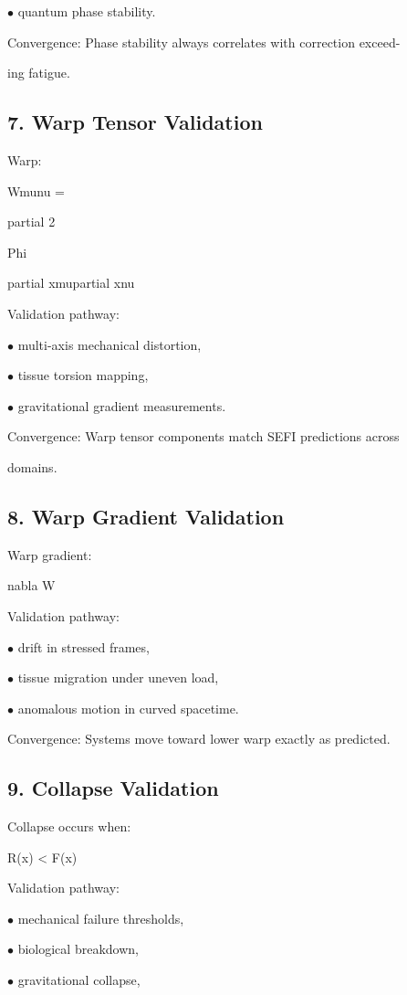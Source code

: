 \documentclass[10pt]{article}
\begin{document}
\noindent $\bullet$ quantum phase stability.

Convergence: Phase stability always correlates with correction exceed-

ing fatigue.

\subsection*{7. Warp Tensor Validation}
Warp:

Wmunu =

partial 2

Phi

partial xmupartial xnu

Validation pathway:

\noindent $\bullet$ multi-axis mechanical distortion,

\noindent $\bullet$ tissue torsion mapping,

\noindent $\bullet$ gravitational gradient measurements.

Convergence: Warp tensor components match SEFI predictions across

domains.

\subsection*{8. Warp Gradient Validation}
Warp gradient:

nabla W

Validation pathway:


\noindent $\bullet$ drift in stressed frames,

\noindent $\bullet$ tissue migration under uneven load,

\noindent $\bullet$ anomalous motion in curved spacetime.

Convergence: Systems move toward lower warp exactly as predicted.

\subsection*{9. Collapse Validation}
Collapse occurs when:

R(x) < F(x)

Validation pathway:

\noindent $\bullet$ mechanical failure thresholds,

\noindent $\bullet$ biological breakdown,

\noindent $\bullet$ gravitational collapse,
\end{document}
